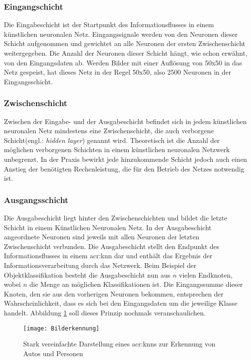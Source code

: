 \subsubsection{Eingangschicht}
Die Eingabeschicht ist der Startpunkt des Informationsflusses in einem künstlichen neuronalen Netz. Eingangssignale werden von den Neuronen dieser Schicht aufgenommen und gewichtet an alle Neuronen der ersten Zwischenschicht weitergegeben. Die Anzahl der Neuronen dieser Schicht hängt, wie schon erwähnt, von den Eingangsdaten ab. Werden Bilder mit einer Auflösung von 50x50 in das Netz gespeist, hat dieses Netz in der Regel 50x50, also 2500 Neuronen in der Eingangsschicht.

\subsubsection{Zwischenschicht}
Zwischen der Eingabe- und der Ausgabeschicht befindet sich in jedem künstlichen neuronalen Netz mindestens eine Zwischenschicht, die auch verborgene Schicht(engl.: \textit{hidden layer}) genannt wird. Theoretisch ist die Anzahl der möglichen verborgenen Schichten in einem künstlichen neuronalen Netzwerk unbegrenzt. In der Praxis bewirkt jede hinzukommende Schicht jedoch auch einen Anstieg der benötigten Rechenleistung, die für den Betrieb des Netzes notwendig ist.

\subsubsection{Ausgangsschicht}
Die Ausgabeschicht liegt hinter den Zwischenschichten und bildet die letzte Schicht in einem Künstlichen Neuronalen Netz. In der Ausgabeschicht angeordnete Neuronen sind jeweils mit allen Neuronen der letzten Zwischenschicht verbunden. Die Ausgabeschicht stellt den Endpunkt des Informationsflusses in einem \acrshort{acr:knn} dar und enthält das Ergebnis der Informationsverarbeitung durch das Netzwerk. Beim Beispiel der Objektklassifikation besteht die Ausgabeschicht nun aus \(n\) vielen Endknoten, wobei \(n\) die Menge an möglichen Klassifikationen ist. Die Eingangssumme dieser Knoten, den sie aus den vorherigen Neuronen bekommen, entsprechen der Wahrscheinlichkeit, dass es sich bei den Eingangsdaten um die jeweilige Klasse handelt. Abbildung \ref{fig:Bilderkennung} soll dieses Prinzip nochmals veranschaulichen. 

\begin{figure}%
	\centering
    \texttt{[image: Bilderkennung]}
    \caption{Stark vereinfachte Darstellung eines \acrshort{acr:knn}s zur Erkennung von Autos und Personen}
    \label{fig:Bilderkennung}
\end{figure}

